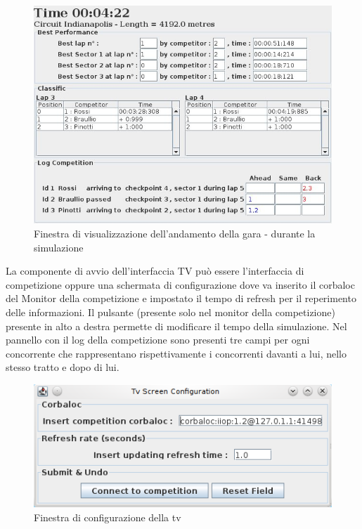 \begin{center}
\begin{figure}[h]
	\includegraphics[scale=0.75]{screenshotRelazione/tv2.jpeg}
	\caption{Finestra di visualizzazione dell'andamento della gara - durante la simulazione}
\end{figure}
\end{center}
La componente di avvio dell'interfaccia TV pu\`{o} essere l'interfaccia di competizione oppure una schermata di configurazione dove va inserito il corbaloc del Monitor della competizione e impostato il tempo di refresh per il reperimento delle informazioni. Il pulsante (presente solo nel monitor della competizione) presente in alto a destra permette di modificare il tempo della simulazione.
Nel pannello con il log della competizione sono presenti tre campi per ogni concorrente che rappresentano rispettivamente i concorrenti davanti a lui, nello stesso tratto e dopo di lui.
\begin{center}
\begin{figure}[H]
	\includegraphics[scale=0.75]{img/ScreenshotRelazione/configurationScreen.jpg}
	\caption{Finestra di configurazione della tv}
\end{figure}
\end{center}
